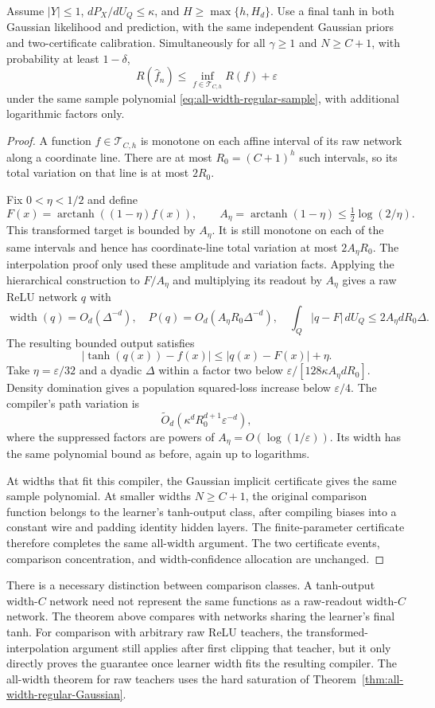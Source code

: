 \begin{theorem}
\label{thm:smooth-output-oracle}
Assume $|Y|\le1$, $dP_X/dU_Q\le\kappa$, and $H\ge\max\{h,H_d\}$. Use a final tanh in both Gaussian likelihood and prediction, with the same independent Gaussian priors and two-certificate calibration. Simultaneously for all $\gamma\ge1$ and $N\ge C+1$, with probability at least $1-\delta$,
\[
 R(\widehat f_n)\le\inf_{f\in\mathcal T_{C,h}}R(f)+\varepsilon
\]
under the same sample polynomial \eqref{eq:all-width-regular-sample}, with additional logarithmic factors only.
\end{theorem}
\begin{proof}
A function $f\in\mathcal T_{C,h}$ is monotone on each affine interval of its raw network along a coordinate line. There are at most $R_0=(C+1)^h$ such intervals, so its total variation on that line is at most $2R_0$.

Fix $0<\eta<1/2$ and define
\[
 F(x)=\operatorname{arctanh}((1-\eta)f(x)),\qquad
 A_\eta=\operatorname{arctanh}(1-\eta)
       \le\tfrac12\log(2/\eta).
\]
This transformed target is bounded by $A_\eta$. It is still monotone on each of the same intervals and hence has coordinate-line total variation at most $2A_\eta R_0$. The interpolation proof only used these amplitude and variation facts. Applying the hierarchical construction to $F/A_\eta$ and multiplying its readout by $A_\eta$ gives a raw ReLU network $q$ with
\[
 \operatorname{width}(q)=O_d(\Delta^{-d}),\quad
 P(q)=O_d(A_\eta R_0\Delta^{-d}),\quad
 \int_Q|q-F|\,dU_Q\le2A_\eta dR_0\Delta.
\]
The resulting bounded output satisfies
\[
 |\tanh(q(x))-f(x)|\le|q(x)-F(x)|+\eta.
\]
Take $\eta=\varepsilon/32$ and a dyadic $\Delta$ within a factor two below $\varepsilon/[128\kappa A_\eta dR_0]$. Density domination gives a population squared-loss increase below $\varepsilon/4$. The compiler's path variation is
\[
 \widetilde O_d(\kappa^d R_0^{d+1}\varepsilon^{-d}),
\]
where the suppressed factors are powers of $A_\eta=O(\log(1/\varepsilon))$. Its width has the same polynomial bound as before, again up to logarithms.

At widths that fit this compiler, the Gaussian implicit certificate gives the same sample polynomial. At smaller widths $N\ge C+1$, the original comparison function belongs to the learner's tanh-output class, after compiling biases into a constant wire and padding identity hidden layers. The finite-parameter certificate therefore completes the same all-width argument. The two certificate events, comparison concentration, and width-confidence allocation are unchanged.
\end{proof}

There is a necessary distinction between comparison classes. A tanh-output width-$C$ network need not represent the same functions as a raw-readout width-$C$ network. The theorem above compares with networks sharing the learner's final tanh. For comparison with arbitrary raw ReLU teachers, the transformed-interpolation argument still applies after first clipping that teacher, but it only directly proves the guarantee once learner width fits the resulting compiler. The all-width theorem for raw teachers uses the hard saturation of Theorem~\ref{thm:all-width-regular-Gaussian}.
